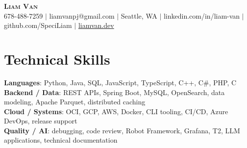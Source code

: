 \documentclass[letterpaper,11pt]{article}
\begin{document}

%
\begin{center}
    \textbf{\Huge \scshape Liam Van} \\ \vspace{1pt}
    \small 678-488-7259 $|$ \small {liamvanpj@gmail.com} $|$ Seattle, WA
 {{$|$ linkedin.com/in/liam-van} {$|$ github.com/SpeciLiam} {$|$ \href{https://liamvan.dev}{liamvan.dev}}}

\end{center}

\section{Technical Skills}
 \begin{itemize}[leftmargin=0.15in, label={}]
    \small{\item{
     \textbf{Languages}{: Python, Java, SQL, JavaScript, TypeScript, C++, C\#, PHP, C} \\
     \textbf{Backend / Data}{: REST APIs, Spring Boot, MySQL, OpenSearch, data modeling, Apache Parquet, distributed caching} \\
     \textbf{Cloud / Systems}{: OCI, GCP, AWS, Docker, CLI tooling, CI/CD, Azure DevOps, release support} \\
     \textbf{Quality / AI}{: debugging, code review, Robot Framework, Grafana, T2, LLM applications, technical documentation} \\
    }}
 \end{itemize}
%

\end{document}
